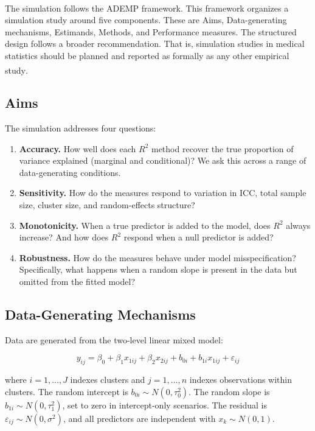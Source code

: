 \documentclass[
  11pt,
]{article}
\begin{document}
The simulation follows the ADEMP framework\textsuperscript{}. This framework organizes a
simulation study around five components. These are Aims,
Data-generating mechanisms, Estimands, Methods, and Performance
measures. The structured design follows a broader
recommendation. That is, simulation studies in medical statistics
should be planned and reported as formally as any other empirical
study\textsuperscript{}.

\subsection{Aims}\label{aims}

The simulation addresses four questions:

\begin{enumerate}
\def\labelenumi{\arabic{enumi}.}
\item
  \textbf{Accuracy.} How well does each \(R^2\) method recover the
  true proportion of variance explained (marginal and
  conditional)? We ask this across a range of data-generating
  conditions.
\item
  \textbf{Sensitivity.} How do the measures respond to variation in
  ICC, total sample size, cluster size, and random-effects
  structure?
\item
  \textbf{Monotonicity.} When a true predictor is added to the
  model, does \(R^2\) always increase? And how does \(R^2\) respond
  when a null predictor is added?
\item
  \textbf{Robustness.} How do the measures behave under model
  misspecification? Specifically, what happens when a random
  slope is present in the data but omitted from the fitted model?
\end{enumerate}

\subsection{Data-Generating Mechanisms}\label{data-generating-mechanisms}

Data are generated from the two-level linear mixed model:

\begin{equation}
y_{ij} = \beta_0 + \beta_1 x_{1ij} + \beta_2 x_{2ij} + b_{0i} +
  b_{1i} x_{1ij} + \varepsilon_{ij}
\label{eq:dgp}
\end{equation}

where \(i = 1, \ldots, J\) indexes clusters and \(j = 1, \ldots, n\)
indexes observations within clusters. The random intercept is
\(b_{0i} \sim N(0, \tau_0^2)\). The random slope is
\(b_{1i} \sim N(0, \tau_1^2)\), set to zero in intercept-only
scenarios. The residual is \(\varepsilon_{ij} \sim N(0, \sigma^2)\),
and all predictors are independent with \(x_k \sim N(0, 1)\).
\end{document}
